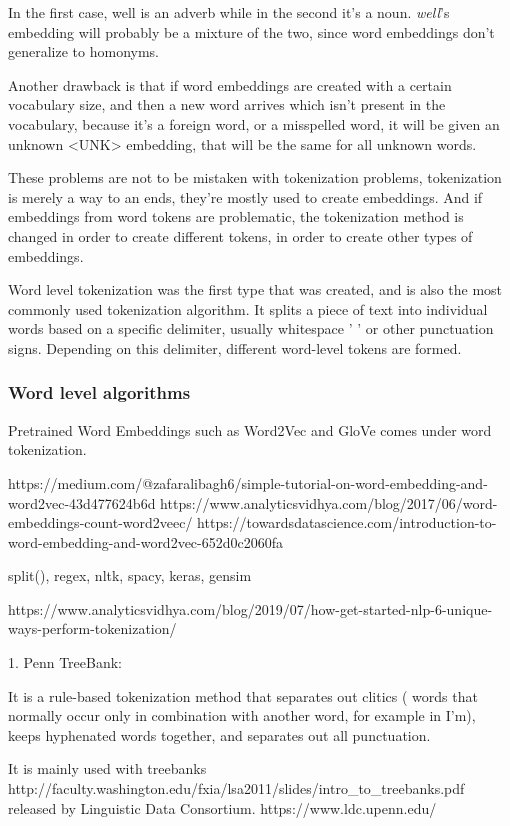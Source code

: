 In the first case, well is an adverb while in the second it's a noun. \emph{well}'s embedding will probably be a mixture of the two, since word embeddings don't generalize to homonyms.

Another drawback is that if word embeddings are created with a certain vocabulary size, and then a new word arrives which isn't present in the vocabulary, because it's a foreign word, or a misspelled word, it will be given an unknown <UNK> embedding, that will be the same for all unknown words.

These problems are not to be mistaken with tokenization problems, tokenization is merely a way to an ends, they're mostly used to create embeddings. And if embeddings from word tokens are problematic, the tokenization method is changed in order to create different tokens, in order to create other types of embeddings.


Word level tokenization was the first type that was created, and is also the most commonly used tokenization algorithm. It splits a piece of text into individual words based on a specific delimiter, usually whitespace ' ' or other punctuation signs. Depending on this delimiter, different word-level tokens are formed.

\subsubsection{Word level algorithms}

Pretrained Word Embeddings such as Word2Vec and GloVe comes under word tokenization.

https://medium.com/@zafaralibagh6/simple-tutorial-on-word-embedding-and-word2vec-43d477624b6d
https://www.analyticsvidhya.com/blog/2017/06/word-embeddings-count-word2veec/
https://towardsdatascience.com/introduction-to-word-embedding-and-word2vec-652d0c2060fa

split(), regex, nltk, spacy, keras, gensim

https://www.analyticsvidhya.com/blog/2019/07/how-get-started-nlp-6-unique-ways-perform-tokenization/

1. Penn TreeBank:

It is a rule-based tokenization method that separates out clitics ( words that normally occur only in combination with another word, for example in I’m), keeps hyphenated words together, and separates out all punctuation.

It is mainly used with treebanks http://faculty.washington.edu/fxia/lsa2011/slides/intro\_to\_treebanks.pdf released by Linguistic Data Consortium. https://www.ldc.upenn.edu/

